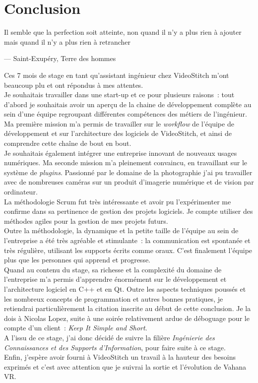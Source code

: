 \chapter{Conclusion}
\epigraph{Il semble que la perfection soit atteinte, non quand il n'y a plus 
rien à ajouter mais quand il n'y a plus rien à retrancher}{--- \small{\textup{Saint-Exupéry,
Terre des hommes}}}

Ces 7 mois de stage en tant qu'assistant ingénieur chez VideoStitch m'ont beaucoup
plu et ont répondus à mes attentes.\\
Je souhaitais travailler dans une start-up et ce pour plusieurs raisons~: tout d'abord
je souhaitais avoir un aperçu de la chaine de développement complète au sein d'une
équipe regroupant différentes compétences des métiers de l'ingénieur. Ma première
mission m'a permis de travailler sur le \textit{workflow} de l'équipe de développement
et sur l'architecture des logiciels de VideoStitch, et ainsi de comprendre cette chaîne
de bout en bout.\\
Je souhaitais également intégrer une entreprise innovant de nouveaux usages
numériques. Ma seconde mission m'a pleinement convaincu, en travaillant sur le 
système de \textit{plugins}. Passionné par le domaine de la photographie j'ai pu 
travailler avec de nombreuses caméras sur un produit d'imagerie numérique
et de vision par ordinateur.\\
\newline
La méthodologie Scrum fut très intéressante et avoir pu l'expérimenter me confirme
dans sa pertinence de gestion des projets logiciels. Je compte utiliser des méthodes
agiles pour la gestion de mes projets futurs.\\
Outre la méthodologie, la dynamique et la petite taille de l'équipe au sein de l'entreprise
a été très agréable et stimulante~: la communication est spontanée et très régulière,
utilisant les supports écrits comme oraux. C'est finalement l'équipe plus que les 
personnes qui apprend et progresse.\\
Quand au contenu du stage, sa richesse et la complexité du domaine de l'entreprise
m'a permis d'apprendre énormément sur le développement et l'architecture logiciel 
en C++ et en Qt. Outre les aspects techniques poussés et les nombreux concepts de
programmation et autres bonnes pratiques, je retiendrai particulièrement la citation 
inscrite au début de cette conclusion. Je la dois à Nicolas Lopez, suite à une soirée
relativement ardue de déboguage pour le compte d'un client~: \textit{Keep It Simple and Short}.\\
\newline
A l'issu de ce stage, j'ai donc décidé de suivre la filière \emph{Ingénierie
des Connaissances et des Supports d'Information}, pour faire suite à ce stage.\\
Enfin, j'espère avoir fourni à VideoStitch un travail à la hauteur des besoins
exprimés et c'est avec attention que je suivrai la sortie et l'évolution de Vahana VR.

